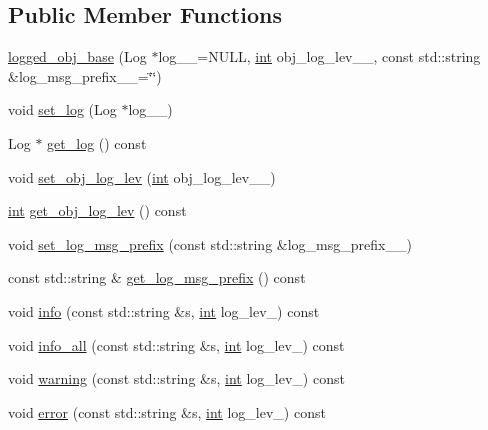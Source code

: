 \subsection*{Public Member Functions}
\begin{DoxyCompactItemize}
\item 
\hyperlink{classutils_1_1logged__obj__base_abe43e6bb25d3632d74bbc5ef7d44e812}{logged\-\_\-obj\-\_\-base} (Log $\ast$log\-\_\-\-\_\-=N\-U\-L\-L, \hyperlink{classint}{int} obj\-\_\-log\-\_\-lev\-\_\-\-\_, const std\-::string \&log\-\_\-msg\-\_\-prefix\-\_\-\-\_\-=\char`\"{}\char`\"{})
\item 
void \hyperlink{classutils_1_1logged__obj__base_a39a0260231fd515605a7e7b51998e1ab}{set\-\_\-log} (Log $\ast$log\-\_\-\-\_\-)
\item 
Log $\ast$ \hyperlink{classutils_1_1logged__obj__base_af4c9d677235300cfdf6c7723ea0c797f}{get\-\_\-log} () const 
\item 
void \hyperlink{classutils_1_1logged__obj__base_a90aef5e7b6b8b657027fb6cee7c582ea}{set\-\_\-obj\-\_\-log\-\_\-lev} (\hyperlink{classint}{int} obj\-\_\-log\-\_\-lev\-\_\-\-\_\-)
\item 
\hyperlink{classint}{int} \hyperlink{classutils_1_1logged__obj__base_ad852b1f302a2e40ad78700575748624e}{get\-\_\-obj\-\_\-log\-\_\-lev} () const 
\item 
void \hyperlink{classutils_1_1logged__obj__base_aa60697c08b5496eaf828faaf34c9c8f2}{set\-\_\-log\-\_\-msg\-\_\-prefix} (const std\-::string \&log\-\_\-msg\-\_\-prefix\-\_\-\-\_\-)
\item 
const std\-::string \& \hyperlink{classutils_1_1logged__obj__base_a3e6a698722d168001bcbe9b2d71964fb}{get\-\_\-log\-\_\-msg\-\_\-prefix} () const 
\item 
void \hyperlink{classutils_1_1logged__obj__base_a5e017d35fbe6aa114be2dddd17edf734}{info} (const std\-::string \&s, \hyperlink{classint}{int} log\-\_\-lev\-\_) const 
\item 
void \hyperlink{classutils_1_1logged__obj__base_af0cad85776307b8911176306dc1f0130}{info\-\_\-all} (const std\-::string \&s, \hyperlink{classint}{int} log\-\_\-lev\-\_) const 
\item 
void \hyperlink{classutils_1_1logged__obj__base_a4a6c6603cbbc7c70fbfb1a446b5c4386}{warning} (const std\-::string \&s, \hyperlink{classint}{int} log\-\_\-lev\-\_) const 
\item 
void \hyperlink{classutils_1_1logged__obj__base_a89c4c627b29fb8569be30efc62508b46}{error} (const std\-::string \&s, \hyperlink{classint}{int} log\-\_\-lev\-\_) const 

\end{DoxyCompactItemize}
